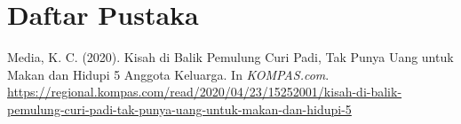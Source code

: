 \documentclass[
  12pt  
]{article}
\newlength{\cslhangindent}
\newlength{\cslentryspacingunit} %
\newenvironment{CSLReferences}[2] %
 {%
  \setlength{\parindent}{0pt}
  \ifodd #1
  \let\oldpar\par
  \def\par{\hangindent=\cslhangindent\oldpar}
  \fi
  \setlength{\parskip}{#2\cslentryspacingunit}
 }%
 {}
\begin{document}
\hypertarget{refs}{}
\section*{Daftar Pustaka}
\begin{CSLReferences}{1}{0}
\leavevmode{}%
Media, K. C. (2020). {Kisah di Balik Pemulung Curi Padi, Tak Punya Uang
untuk Makan dan Hidupi 5 Anggota Keluarga}. In \emph{KOMPAS.com}.
\url{https://regional.kompas.com/read/2020/04/23/15252001/kisah-di-balik-pemulung-curi-padi-tak-punya-uang-untuk-makan-dan-hidupi-5}

\end{CSLReferences}
\end{document}
